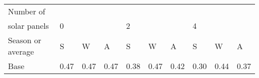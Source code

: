 \begin{table}[h] 
\centering 
\begin{tabular}{l|lll|lll|lll}Number of \\ solar panels&0& & &2& & &4& & \\ \hline 
Season or average & S & W & A & S & W & A & S & W & A \\ \hline 
Base&0.47&0.47&0.47&0.38&0.47&0.42&0.30&0.44&0.37 \\ 
\end{tabular} 
\end{table}